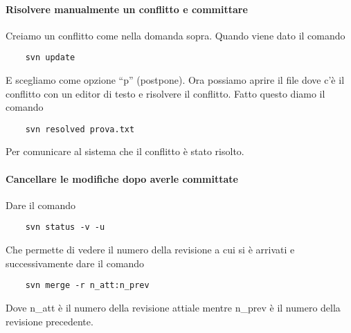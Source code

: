 \documentclass[a4paper]{article}
\begin{document}
	\paragraph{Risolvere manualmente un conflitto e committare}
	Creiamo un conflitto come nella domanda sopra. Quando viene dato il comando 
	\begin{verbatim}
	svn update
	\end{verbatim}
	E scegliamo come opzione ``p'' (postpone). Ora possiamo aprire il file dove c'è il conflitto con un editor di testo e risolvere il conflitto. Fatto questo diamo il comando
	\begin{verbatim}
	svn resolved prova.txt
	\end{verbatim}
	Per comunicare al sistema che il conflitto è stato risolto.

	\paragraph{Cancellare le modifiche dopo averle committate}
	Dare il comando 
	\begin{verbatim}
	svn status -v -u
	\end{verbatim}
	Che permette di vedere il numero della revisione a cui si è arrivati e successivamente dare il comando
	\begin{verbatim}
	svn merge -r n_att:n_prev
	\end{verbatim}
	Dove n\_att è il numero della revisione attiale mentre n\_prev è il numero della revisione precedente.
	
\end{document}
